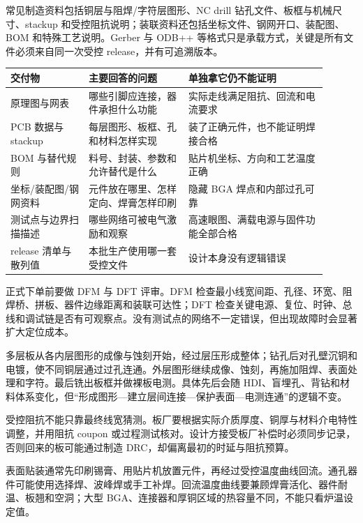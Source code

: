 
常见制造资料包括铜层与阻焊/字符层图形、NC drill 钻孔文件、板框与机械尺寸、stackup 和受控阻抗说明；装联资料还包括坐标文件、钢网开口、装配图、BOM 和特殊工艺说明。Gerber 与 ODB++ 等格式只是承载方式，关键是所有文件必须来自同一次受控 release，并有可追溯版本。

\begin{longtable}{L{0.22\linewidth}L{0.29\linewidth}L{0.39\linewidth}}
\toprule
交付物 & 主要回答的问题 & 单独拿它仍不能证明 \\
\midrule
原理图与网表 & 哪些引脚应连接，器件承担什么功能 & 实际走线满足阻抗、回流和电流要求 \\\tablerowrule
PCB 数据与 stackup & 每层图形、板框、孔和材料怎样实现 & 装了正确元件，也不能证明焊接合格 \\\tablerowrule
BOM 与替代规则 & 料号、封装、参数和允许替代是什么 & 贴片机坐标、方向和工艺温度正确 \\\tablerowrule
坐标/装配图/钢网资料 & 元件放在哪里、怎样定向、焊膏怎样印刷 & 隐藏 BGA 焊点和内部过孔可靠 \\\tablerowrule
测试点与边界扫描描述 & 哪些网络可被电气激励和观察 & 高速眼图、满载电源与固件功能全部合格 \\\tablerowrule
release 清单与散列值 & 本批生产使用哪一套受控文件 & 设计本身没有逻辑错误 \\
\bottomrule
\end{longtable}

正式下单前要做 DFM 与 DFT 评审。DFM 检查最小线宽间距、孔径、环宽、阻焊桥、拼板、器件边缘距离和装联可达性；DFT 检查关键电源、复位、时钟、总线和调试链是否有可观察点。没有测试点的网络不一定错误，但出现故障时会显著扩大定位成本。


多层板从各内层图形的成像与蚀刻开始，经过层压形成整体；钻孔后对孔壁沉铜和电镀，使不同铜层通过过孔连通。外层图形继续成像、蚀刻，再施加阻焊、表面处理和字符。最后铣出板框并做裸板电测。具体先后会随 HDI、盲埋孔、背钻和材料体系变化，但“形成图形—建立层间连接—保护表面—电测连通”的逻辑不变。

受控阻抗不能只靠最终线宽猜测。板厂要根据实际介质厚度、铜厚与材料介电特性调整，并用阻抗 coupon 或过程测试核对。设计方接受板厂补偿时必须同步记录，否则回来的板可能通过制造 DRC，却偏离最初的时延与阻抗预算。


表面贴装通常先印刷锡膏、用贴片机放置元件，再经过受控温度曲线回流。通孔器件可能使用选择焊、波峰焊或手工补焊。回流温度曲线要兼顾焊膏活化、器件耐温、板翘和空洞；大型 BGA、连接器和厚铜区域的热容量不同，不能只看炉温设定值。

